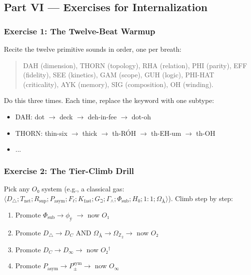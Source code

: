 \documentclass[12pt,a4paper]{article}
\begin{document}
\subsection{Part VI --- Exercises for Internalization}

\subsubsection{Exercise 1: The Twelve-Beat Warmup}

Recite the twelve primitive sounds in order, one per breath:

\begin{quote}
DAH (dimension), THORN (topology), RHA (relation), PHI (parity),
EFF (fidelity), SEE (kinetics), GAM (scope), GUH (logic),
PHI-HAT (criticality), AYK (memory), SIG (composition), OH (winding).

\end{quote}

Do this three times. Each time, replace the keyword with one subtype:

\begin{itemize}
    \item DAH: dot $\rightarrow$ deck $\rightarrow$ deh-in-fee $\rightarrow$ dot-oh
    \item THORN: thin-six $\rightarrow$ thick $\rightarrow$ th-RÓH $\rightarrow$ th-EH-um $\rightarrow$ th-OH
    \item ...
\end{itemize}

\subsubsection{Exercise 2: The Tier-Climb Drill}

Pick any $O₀$ system (e.g., a classical gas: $\langle D_{\triangle}; T_\text{net}; R_\text{sup}; P_\text{asym}; F_{\ell}; K_\text{fast}; G_{\beth}; \Gamma_{\wedge}; \Phi_\text{sub}; H_0; 1:1; \Omega_Å \rangle$).
Climb step by step:

\begin{enumerate}
    \item Promote $\Phi_\text{sub} \to \phi_ÿ$ $\rightarrow$ now $O₁$
    \item Promote $D_{\triangle} \to D_C$ AND $\Omega_Å \to \Omega_{\mathbb{Z}_2} \to$ now $O₂$
    \item Promote $D_C \to D_{\infty} \to$ now $O₂^\dagger$
    \item Promote $P_\text{asym} \to P_{\pm}^{\text{sym}} \to$ now $O_{\infty}$
\end{enumerate}
\end{document}

